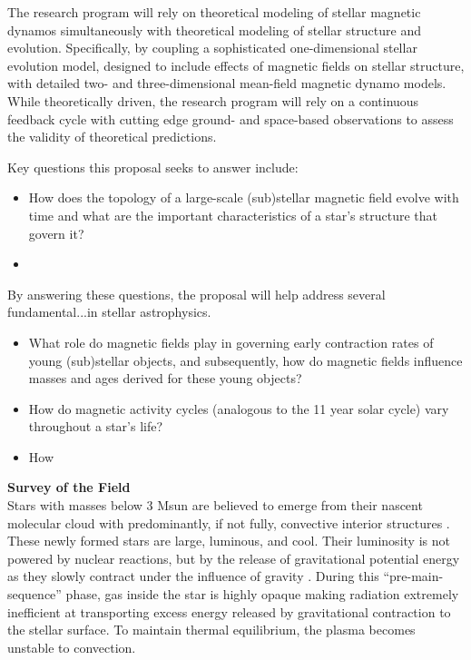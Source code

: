 \documentclass[12pt,a4paper]{article}
\begin{document}
The research program will rely on theoretical modeling of stellar magnetic dynamos simultaneously with theoretical modeling of stellar structure and evolution. Specifically, by coupling a sophisticated one-dimensional stellar evolution model, designed to include effects of magnetic fields on stellar structure, with detailed two- and three-dimensional mean-field magnetic dynamo models. While theoretically driven, the research program will rely on a continuous feedback cycle with cutting edge ground- and space-based observations to assess the validity of theoretical predictions.


Key questions this proposal seeks to answer include:
\begin{itemize}[leftmargin=0.25in]
	\item How does the topology of a large-scale (sub)stellar magnetic field evolve with time and what are the important characteristics of a star's structure that govern it?
	\item 
\end{itemize}

By answering these questions, the proposal will help address several fundamental...in stellar astrophysics.
\begin{itemize}[leftmargin=0.25in]
	\item What role do magnetic fields play in governing early contraction rates of young (sub)stellar objects, and subsequently, how do magnetic fields influence masses and ages derived for these young objects?
	\item How do magnetic activity cycles (analogous to the 11 year solar cycle) vary throughout a star's life?
	\item How  
\end{itemize}

\clearpage

{\bf \large Survey of the Field} \\
Stars with masses below 3 Msun are believed to emerge from their nascent molecular cloud with predominantly, if not fully, convective interior structures \citep{Hayashi1961}. 
These newly formed stars are large, luminous, and cool. Their luminosity is not powered by nuclear reactions, but by the release of gravitational potential energy as they slowly contract under the influence of gravity \citep{Henyey1955}. During this ``pre-main-sequence'' phase, gas inside the star is highly opaque making radiation extremely inefficient at transporting excess energy released by gravitational contraction to the stellar surface. To maintain thermal equilibrium, the plasma becomes unstable to convection. 
\end{document}
